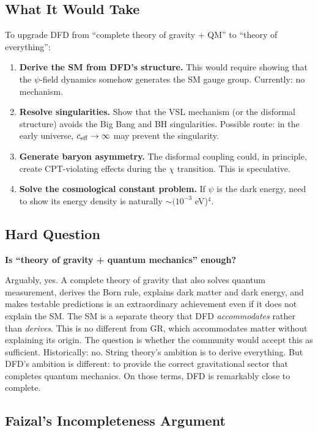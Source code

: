 \documentclass[11pt,a4paper]{article}
\begin{document}
\subsection{What It Would Take}

To upgrade DFD from ``complete theory of gravity + QM'' to ``theory of everything'':
\begin{enumerate}
\item \textbf{Derive the SM from DFD's structure.} This would require showing that the $\psi$-field dynamics somehow generates the SM gauge group. Currently: no mechanism.

\item \textbf{Resolve singularities.} Show that the VSL mechanism (or the disformal structure) avoids the Big Bang and BH singularities. Possible route: in the early universe, $c_{\rm eff} \to \infty$ may prevent the singularity.

\item \textbf{Generate baryon asymmetry.} The disformal coupling could, in principle, create CPT-violating effects during the $\chi$ transition. This is speculative.

\item \textbf{Solve the cosmological constant problem.} If $\psi$ is the dark energy, need to show its energy density is naturally $\sim (10^{-3}$ eV)$^4$.
\end{enumerate}

\subsection{Hard Question}

\textbf{Is ``theory of gravity + quantum mechanics'' enough?}

Arguably, yes. A complete theory of gravity that also solves quantum measurement, derives the Born rule, explains dark matter and dark energy, and makes testable predictions is an extraordinary achievement even if it does not explain the SM. The SM is a separate theory that DFD \emph{accommodates} rather than \emph{derives}. This is no different from GR, which accommodates matter without explaining its origin. The question is whether the community would accept this as sufficient. Historically: no. String theory's ambition is to derive everything. But DFD's ambition is different: to provide the correct gravitational sector that completes quantum mechanics. On those terms, DFD is remarkably close to complete.

\subsection{Faizal's Incompleteness Argument}
\end{document}
